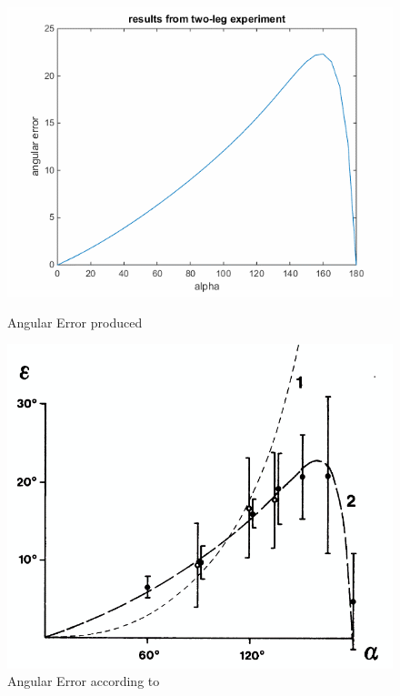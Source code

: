 \documentclass[11pt]{article}
\begin{document}
\begin{figure}[h!]%
\begin{minipage}[t]{7.9 cm}
\centering
\includegraphics[scale=0.4]{./Pics/angularError.png} 
\caption{Angular Error produced \label{fig:AngErrorProd} }
\end{minipage}
%
\begin{minipage}[t]{7.9 cm}
\centering
\includegraphics[scale=0.3]{./Pics/angularErrorOfWehner.png} 
\caption{Angular Error according to \cite{Wehner1988} \label{fig:AngErrorWehner} }
\end{minipage}
\end{figure}
\end{document}
